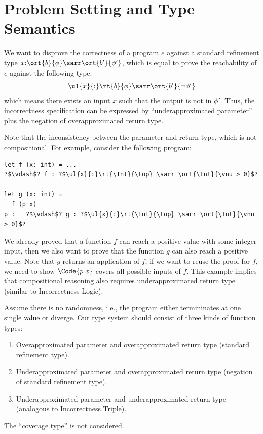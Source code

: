 \section{Problem Setting and Type Semantics}

We want to disprove the correctness of a program $e$ against a standard refinement type $x{:}\ort{b}{\phi} \sarr \ort{b'}{\phi'}$, which is equal to prove the reachability of $e$ against the following type:
\begin{align*}
    \ul{x}{:}\rt{b}{\phi} \sarr \ort{b'}{\neg \phi'}
\end{align*}\noindent
which means there exists an input $x$ such that the output is not in $\phi'$. Thus, the incorrectness specification can be expressed by ``underapproximated parameter'' plus the negation of overapproximated return type.

Note that the inconsistency between the parameter and return type, which is not compositional. For example, consider the following program:

\begin{verbatim}
let f (x: int) = ...
?$\vdash$? f : ?$\ul{x}{:}\rt{\Int}{\top} \sarr \ort{\Int}{\vnu > 0}$?

let g (x: int) =
  f (p x)
p : _ ?$\vdash$? g : ?$\ul{x}{:}\rt{\Int}{\top} \sarr \ort{\Int}{\vnu > 0}$?
\end{verbatim}

We already proved that a function $f$ can reach a positive value with some integer input, then we also want to prove that the function $g$ can also reach a positive value. Note that $g$ returns an application of $f$, if we want to reuse the proof for $f$, we need to show $\Code{p\;x}$ covers all possible inputs of $f$. This example implies that compositional reasoning also requires underapproximated return type (similar to Incorrectness Logic).

Assume there is no randomness, i.e., the program either termininates at one single value or diverge. Our type system should consist of three kinds of function types:
\begin{enumerate}
    \item Overapproximated parameter and overapproximated return type (standard refinement type).
    \item Underapproximated parameter and overapproximated return type (negation of standard refinement type).
    \item Underapproximated parameter and underapproximated return type (analogous to Incorrectness Triple).
\end{enumerate}
The ``coverage type'' is not considered.

